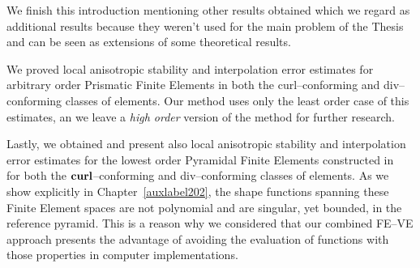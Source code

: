 We finish this introduction mentioning other results obtained which we regard
as additional results because they weren't used
for the main problem
of the Thesis and can be seen as extensions of some theoretical results.

We proved local anisotropic 
stability and
interpolation error estimates for arbitrary order Prismatic Finite Elements in both
the curl--conforming and div--conforming classes of elements. Our method uses only
the least order case of this estimates, an we leave a \emph{high order} version
of the method for further research.

Lastly, we obtained and present also local anisotropic stability
and interpolation error estimates for the lowest order Pyramidal
Finite Elements constructed in~\cite{gh99, Nigam-2012} for both
the $\textbf{curl}$--conforming and div--conforming classes of elements. As we show
explicitly in Chapter~\ref{auxlabel202}, the shape functions 
spanning these Finite Element spaces are not polynomial and are singular, yet bounded,
in the reference pyramid. This is a reason why we considered that
our combined FE--VE approach presents the advantage of avoiding the evaluation
of functions with those properties in computer implementations.   

